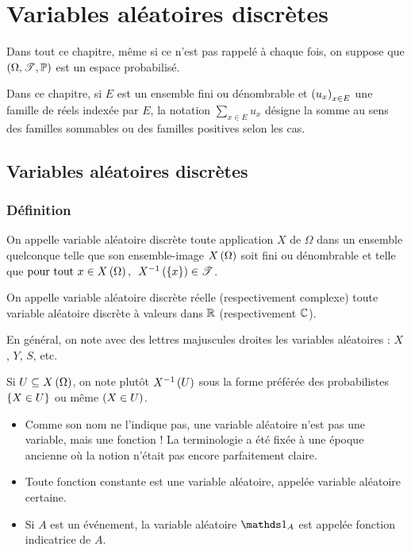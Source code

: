 \chapter{Variables aléatoires discrètes}

\minitoc

Dans tout ce chapitre, même si ce n'est pas rappelé à chaque fois, on suppose que \(\anneau{\Omega}[\fami{T}][\prem]\) est un espace probabilisé.

Dans ce chapitre, si \(E\) est un ensemble fini ou dénombrable et \(\left(u_x\right)_{x\in E}\) une famille de réels indexée par \(E\), la notation \(\sum_{x\in E}u_x\) désigne la somme au sens des familles sommables ou des familles positives selon les cas.

\section{Variables aléatoires discrètes}

\subsection{Définition}

\begin{defi}
On appelle variable aléatoire discrète toute application \(X\) de \(\Omega\) dans un ensemble quelconque telle que son ensemble-image \(X\left(\Omega\right)\) soit fini ou dénombrable et telle que \(\quantifs{\tpt x\in X\paren{\Omega}}X\inv\paren{\accol{x}}\in\fami{T}\).

On appelle variable aléatoire discrète réelle (respectivement complexe) toute variable aléatoire discrète à valeurs dans \(\mathbb{R}\) (respectivement \(\mathbb{C}\)).
\end{defi}

En général, on note avec des lettres majuscules droites les variables aléatoires : \(X\), \(Y\), \(S\), etc.

Si \(U\subseteq X\left(\Omega\right)\), on note plutôt \(X^{-1}\left(U\right)\) sous la forme préférée des probabilistes \(\left\lbrace X\in U\right\rbrace\) ou même \(\left(X\in U\right)\).

\begin{rem}
\begin{itemize}
    \item Comme son nom ne l'indique pas, une variable aléatoire n'est pas une variable, mais une fonction ! La terminologie a été fixée à une époque ancienne où la notion n'était pas encore parfaitement claire. \\
    \item Toute fonction constante est une variable aléatoire, appelée variable aléatoire certaine. \\
    \item Si \(A\) est un événement, la variable aléatoire \(\ind{A}\) est appelée fonction indicatrice de \(A\).
\end{itemize}
\end{rem}

